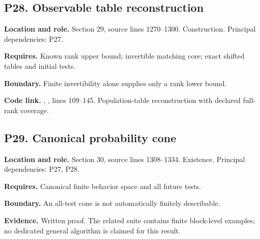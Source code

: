 \documentclass[11pt,letterpaper]{article}
\begin{document}
\par\noindent\begin{minipage}{\textwidth}
\subsection{P28. Observable table
reconstruction}\label{p28.-observable-table-reconstruction}

\textbf{Location and role.} Section 29, source lines 1270--1300.
Construction. Principal dependencies: P27.

\textbf{Requires.} Known rank upper bound; invertible matching core;
exact shifted tables and initial tests.

\textbf{Boundary.} Finite invertibility alone supplies only a rank lower
bound.

\textbf{Code link.} ,
, lines 109--145. Population-table reconstruction with
declared full-rank coverage.
\end{minipage}\par\medskip

\par\noindent\begin{minipage}{\textwidth}
\subsection{P29. Canonical probability
cone}\label{p29.-canonical-probability-cone}

\textbf{Location and role.} Section 30, source lines 1308--1334.
Existence. Principal dependencies: P27, P28.

\textbf{Requires.} Canonical finite behavior space and all future tests.

\textbf{Boundary.} An all-test cone is not automatically finitely
describable.

\textbf{Evidence.} Written proof. The related suite contains finite
block-level examples; no dedicated general algorithm is claimed for this
result.
\end{minipage}\par\medskip
\end{document}
